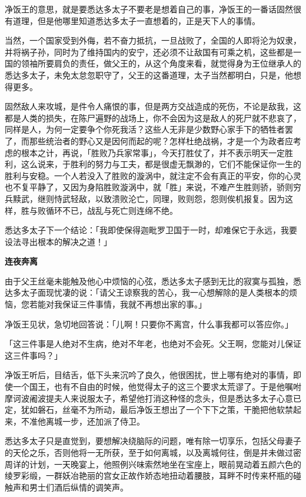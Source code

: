 \documentclass[twoside,openany]{book}
\newcommand{\mt}[1]{\textbullet \textbf{#1}}
\begin{document}
净饭王的意思，就是要悉达多太子不要老是想着自己的事，净饭王的一番话固然很有道理，但是他哪里知道悉达多太子一直想着的，正是天下人的事情。

当然，一个国家受到外侮，若不奋力抵抗，一旦战败了，全国的人即将沦为奴隶，并将祸子孙，同时为了维持国内的安宁，还必须不让敌国有可乘之机，这些都是一国的领袖所要肩负的责任，做父王的，从这个角度来看，就觉得身为王位继承人的悉达多太子，未免太怠忽职守了，父王的这番道理，太子当然都明白，只是，他想得更多。

固然敌人来攻城，是件令人痛恨的事，但是两方交战造成的死伤，不论是敌我，这都是人类的损失，在陈尸遍野的战场上，你不会因为这是敌人的死尸就不悲哀了，同样是人，为何一定要争个你死我活？这些人无非是少数野心家手下的牺牲者罢了，而那些统治者的野心又是因何而起的呢？怎样杜绝战祸，才是一个为政者应考虑的根本之计，再说，「胜败乃兵家常事」，今天打胜仗了，并不表示明天一定胜利，这么说来，于胜利的努力与工夫，都是很虚无飘渺的，它们不能保证你一生的胜利与安稳。一个人若没入了胜败的漩涡中，就注定不会有真正的平安，你的心灵也不复平静了，又因为身陷胜败漩涡中，就「胜」来说，不难产生胜则骄，骄则穷兵黩武，继则恃武轻敌，以致溃败沦亡，同理，败则怨，怨则俟机报复。因为这样，胜与败循环不已，战乱与死亡则连绵不绝。

悉达多太子下一个结论：「我即使保得迦毗罗卫国于一时，却难保它于永远，我要设法寻出根本的解决之道！」

\mt{连夜奔离}

由于父王丝毫未能触及他心中烦恼的心弦，悉达多太子感到无比的寂寞与孤独，悉达多太子面现忧凄的说：「请父王谅察我的苦心，我一心想解除的是人类根本的烦恼，您若能对我保证三件事情，我就不再想出家的事。」

净饭王见状，急切地回答说：「儿啊！只要你不离宫，什么事我都可以答应你。」

「这三件事是人绝对不生病，绝对不年老，也绝对不会死。父王啊，您能对儿保证这三件事吗？」

净饭王听后，目结舌，低下头来沉吟了良久，他很困扰，世上哪有绝对的事情，即使一个国王，也有不自由的时候，他觉得太子的这三个要求太荒谬了。于是他嘱咐摩诃波阇波提夫人来说服太子，希望他打消这种怪的念头，但是悉达多太子心意已定，犹如磐石，丝毫不为所动，最后净饭王想出了一个下下之策，干脆把他软禁起来，不准他离城一步，还加派了侍卫。

悉达多太子只是直觉到，要想解决绕脑际的问题，唯有除一切享乐，包括父母妻子的天伦之乐，否则他将一无所获，至于如何离城，以及离城何往，倒是并未做过密周详的计划，一天晚宴上，他照例兴味索然地坐在宝座上，眼前晃动着五颜六色的绫罗彩缎，一群妖冶艳丽的宫女正故作娇态地扭动着腰肢，耳畔不时传来杯瓶的碰触声和男士们酒后纵情的调笑声。
\end{document}
